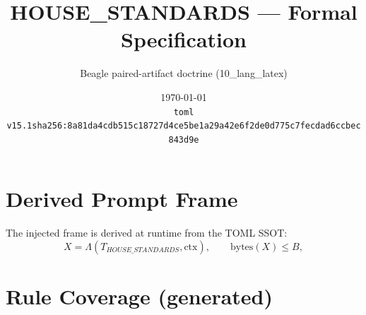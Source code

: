 \documentclass[11pt]{article}
\title{HOUSE\_STANDARDS --- Formal Specification}
\author{Beagle paired-artifact doctrine (10\_lang\_latex)}
\date{\today\\ \texttt{toml v15.1\quad sha256:8a81da4cdb515c18727d4ce5be1a29a42e6f2de0d775c7fecdad6ccbec843d9e}}
\begin{document}
\maketitle

\section{Derived Prompt Frame}
The injected frame is derived at runtime from the TOML SSOT:
\begin{equation}
  X = \Lambda(T_{HOUSE\_STANDARDS}, \mathrm{ctx}), \qquad \mathrm{bytes}(X) \le B,
  \label{lbl:derive-frame}
\end{equation}

\section{Rule Coverage (generated)}
\end{document}
